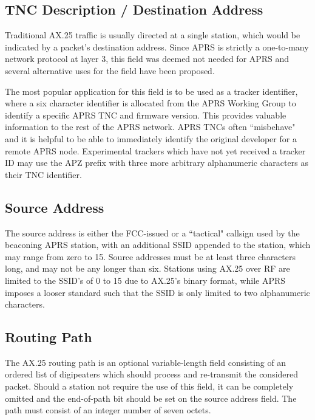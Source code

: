 \subsection{TNC Description / Destination Address}

Traditional AX.25 traffic is usually directed at a single station, which would be indicated by 
a packet's destination address. 
Since APRS is strictly a one-to-many network protocol at layer 3, this field
was deemed not needed for APRS and several alternative uses for the field have been proposed.

The most popular application for this field is to be used as a tracker identifier, where a
six character identifier is allocated from the APRS Working Group to identify a specific 
APRS TNC and firmware version. 
This provides valuable information to the rest of the APRS network.
APRS
TNCs often ``misbehave" and it is helpful to be able to immediately identify the original
developer for a remote APRS node. 
Experimental trackers which have not yet received a tracker ID may use the 
APZ prefix with three more arbitrary alphanumeric characters as their TNC identifier.

\subsection{Source Address}

The source address is either the FCC-issued or a ``tactical" callsign used by 
the beaconing APRS station, with an 
additional SSID appended to the station, which may range from zero to 15. Source addresses must 
be at least three characters long, and may not be any longer than six. Stations using AX.25 
over RF are limited to the SSID's of 0 to 15 due to AX.25's binary format, 
while APRS imposes a looser standard such that the SSID is only limited to 
two alphanumeric characters.

\subsection{Routing Path}
\label{subsec:ax25RoutingPath}

The AX.25 routing path is an optional variable-length field consisting of an ordered list of
digipeaters which should process and re-transmit the considered packet. Should a station not
require the use of this field, it can be completely omitted and the end-of-path bit should be
set on the source address field. The path must consist of an integer number of seven octets.

